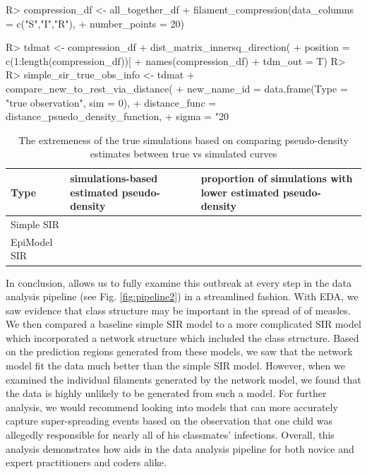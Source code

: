 \documentclass[
  shortnames]{jss}
\begin{document}
\begin{CodeChunk}
\begin{CodeInput}
R> compression_df <- all_together_df %
+   filament_compression(data_columns = c("S","I","R"), 
+                        number_points = 20)
\end{CodeInput}
\end{CodeChunk}

\begin{CodeChunk}
\begin{CodeInput}
R> tdmat <- compression_df %
+   dist_matrix_innersq_direction(
+     position = c(1:length(compression_df))[
+       names(compression_df) %
+     tdm_out = T)
R> 
R> simple_sir_true_obs_info <- tdmat %
+   compare_new_to_rest_via_distance(
+     new_name_id = data.frame(Type = "true observation", sim = 0),
+     distance_func = distance_psuedo_density_function, 
+     sigma = "20%
\end{CodeInput}
\end{CodeChunk}

\begin{CodeChunk}
\begin{table}[!h]

\caption{\label{tab:hags-extreme}The extremeness of the true simulations based on comparing pseudo-density estimates between true vs simulated curves}
\centering
\begin{tabular}[t]{l>{\raggedleft\arraybackslash}p{6cm}>{\raggedleft\arraybackslash}p{6cm}}
\toprule
Type & simulations-based estimated pseudo-density & proportion of simulations with lower estimated pseudo-density\\
\midrule
Simple SIR & 0.0036733 & 0.00\\
EpiModel SIR & 0.0118283 & 0.03\\
\bottomrule
\end{tabular}
\end{table}

\end{CodeChunk}

In conclusion,  allows us to fully examine this outbreak
at every step in the data analysis pipeline (see Fig.
\ref{fig:pipeline2}) in a streamlined fashion. With EDA, we saw evidence
that class structure may be important in the spread of of measles. We
then compared a baseline simple SIR model to a more complicated SIR
model which incorporated a network structure which included the class
structure. Based on the prediction regions generated from these models,
we saw that the network model fit the data much better than the simple
SIR model. However, when we examined the individual filaments generated
by the network model, we found that the data is highly unlikely to be
generated from such a model. For further analysis, we would recommend
looking into models that can more accurately capture super-spreading
events based on the observation that one child was allegedly responsible
for nearly all of his classmates' infections. Overall, this analysis
demonstrates how  aids in the data analysis pipeline for
both novice and expert practitioners and coders alike.
\end{document}
